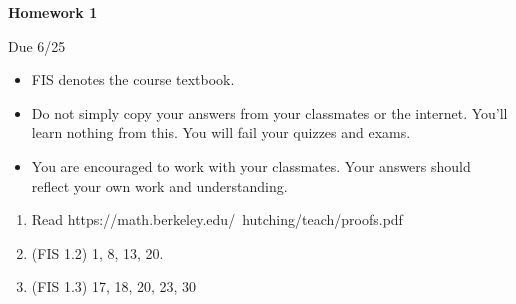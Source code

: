 \documentclass{article}
\begin{document}
\begin{center}
    {\bf Homework 1}
    
    Due 6/25
\end{center}

\begin{itemize}
    \item 
        FIS denotes the course textbook.
    \item
        Do not simply copy your answers from your classmates or the internet.
        You'll learn nothing from this. You will fail your quizzes and exams.
    \item
        You are encouraged to work with your classmates. Your answers
        should reflect your own work and understanding.
\end{itemize}

\begin{enumerate}
    \item
        Read https://math.berkeley.edu/~hutching/teach/proofs.pdf
    \item
        (FIS 1.2) 1, 8, 13, 20.
    \item
        (FIS 1.3) 17, 18, 20, 23, 30
\end{enumerate}
    
\end{document}
